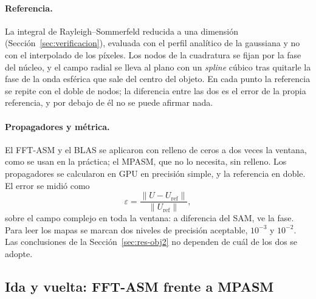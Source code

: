 \paragraph{Referencia.} La integral de Rayleigh--Sommerfeld reducida a una
dimensión (Sección~\ref{sec:verificacion}), evaluada con el perfil analítico
de la gaussiana y no con el interpolado de los píxeles. Los nodos de la
cuadratura se fijan por la fase del núcleo, y el campo radial se lleva al
plano con un \emph{spline} cúbico tras quitarle la fase de la onda esférica
que sale del centro del objeto. En cada punto la referencia se repite con el
doble de nodos; la diferencia entre las dos es el error de la propia
referencia, y por debajo de él no se puede afirmar nada.

\paragraph{Propagadores y métrica.} El FFT-ASM y el BLAS se aplicaron con
relleno de ceros a dos veces la ventana, como se usan en la práctica; el
MPASM, que no lo necesita, sin relleno. Los propagadores se calcularon en GPU
en precisión simple, y la referencia en doble. El error se midió como
\begin{equation}
  \varepsilon = \frac{\lVert U - U_\mathrm{ref}\rVert}{\lVert U_\mathrm{ref}\rVert},
  \label{eq:error-relativo}
\end{equation}
sobre el campo complejo en toda la ventana: a diferencia del SAM, ve la fase.
Para leer los mapas se marcan dos niveles de precisión aceptable, $10^{-3}$ y
$10^{-2}$. Las conclusiones de la Sección~\ref{sec:res-obj2} no dependen de
cuál de los dos se adopte.

\subsection{Ida y vuelta: FFT-ASM frente a MPASM}
\label{sec:metodo-fresnel}

